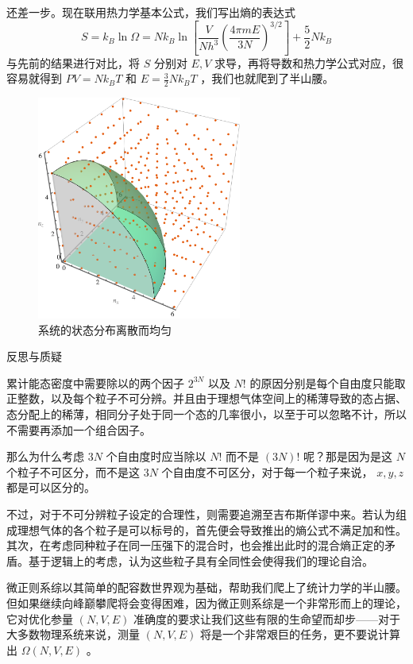 \documentclass[hyperref,UTF-8]{ctexart}
\newcommand{\0}{\boldsymbol{0}}
\begin{document}
还差一步。现在联用热力学基本公式，我们写出熵的表达式
\[
    S = k_B\ln \Omega = Nk_B \ln\left[ \frac{V}{N h^3} \left(\frac{4\pi mE}{3N} \right)^{3/2}  \right] + \frac{5}{2} N k_B
\]
与先前的结果进行对比，将 $S$ 分别对 $E,V$ 求导，再将导数和热力学公式对应，很容易就得到 $PV = Nk_B T$ 和 $E = \frac{3}{2}N k_BT$ ，我们也就爬到了半山腰。

\begin{figure}[ht]
    \centering
    \includegraphics[width=0.6\textwidth]{taimidu.png}
    \caption{系统的状态分布离散而均匀}
    \label{fig:taimidu}
\end{figure}

\begin{justification}{\kaishu 反思与质疑}
    \kaishu \fontsize{11pt}{16pt}
    
    \quad\quad 累计能态密度中需要除以的两个因子 $2^{3N}$ 以及 $N!$ 的原因分别是每个自由度只能取正整数，以及每个粒子不可分辨。并且由于理想气体空间上的稀薄导致的态占据、态分配上的稀薄，相同分子处于同一个态的几率很小，以至于可以忽略不计，所以不需要再添加一个组合因子。

    \quad\quad 那么为什么考虑 $3N$ 个自由度时应当除以 $N!$ 而不是 $(3N)!$ 呢？那是因为是这 $N$ 个粒子不可区分，而不是这 $3N$ 个自由度不可区分，对于每一个粒子来说， $x, y, z$ 都是可以区分的。

    \quad\quad 不过，对于不可分辨粒子设定的合理性，则需要追溯至吉布斯佯谬中来。若认为组成理想气体的各个粒子是可以标号的，首先便会导致推出的熵公式不满足加和性。其次，在考虑同种粒子在同一压强下的混合时，也会推出此时的混合熵正定的矛盾\cite{Pathria}。基于逻辑上的考虑，认为这些粒子具有全同性会使得我们的理论自洽。
\end{justification}

微正则系综以其简单的配容数世界观为基础，帮助我们爬上了统计力学的半山腰。但如果继续向峰巅攀爬将会变得困难，因为微正则系综是一个非常形而上的理论，它对优化参量 $(N,V,E)$ 准确度的要求让我们这些有限的生命望而却步——对于大多数物理系统来说，测量 $(N,V,E)$ 将是一个非常艰巨的任务，更不要说计算出 $\Omega(N,V,E)$ 。
\end{document}
